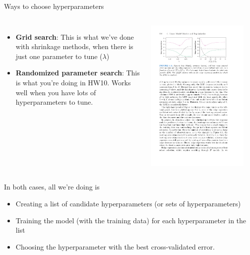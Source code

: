\documentclass[mathserif, aspectratio=169, xcolor=table]{beamer}
\begin{document}
\begin{frame}{Ways to choose hyperparameters}
\pause
	\begin{columns}
			\begin{itemize}
				\item \textbf{Grid search}: This is what we've done with shrinkage methods, when there is just one parameter to tune ($\lambda$)
				\item \textbf{Randomized parameter search}: This is what you're doing in HW10.  Works well when you have lots of hyperparameters to tune.
			\end{itemize}
			\includegraphics[width=0.9\textwidth]{bias-variance-ridge}
	\end{columns}
	In both cases, all we're doing is 
	\begin{itemize}
		\item Creating a list of candidate hyperparameters (or sets of hyperparameters)
		\item Training the model (with the training data) for each hyperparameter in the list
		\item Choosing the hyperparameter with the best cross-validated error.
	\end{itemize}
\end{frame}
\end{document}
